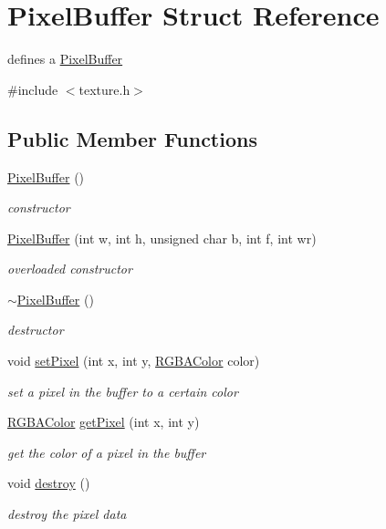 \hypertarget{struct_pixel_buffer}{}\section{Pixel\+Buffer Struct Reference}
\label{struct_pixel_buffer}


defines a \hyperlink{struct_pixel_buffer}{Pixel\+Buffer}  




{\ttfamily \#include $<$texture.\+h$>$}

\subsection*{Public Member Functions}
\begin{DoxyCompactItemize}
\item 
\hyperlink{struct_pixel_buffer_aa1d5199f80acc1c154a289b4519a7b97}{Pixel\+Buffer} ()
\begin{DoxyCompactList}\small\item\em constructor \end{DoxyCompactList}\item 
\hyperlink{struct_pixel_buffer_ada8b571a542bdd0be9cbe29116aac7c8}{Pixel\+Buffer} (int w, int h, unsigned char b, int f, int wr)
\begin{DoxyCompactList}\small\item\em overloaded constructor \end{DoxyCompactList}\item 
\mbox{\label{struct_pixel_buffer_ac2ac8a033a3c75cdb4f7e69b2724b3d7}} 
\hyperlink{struct_pixel_buffer_ac2ac8a033a3c75cdb4f7e69b2724b3d7}{$\sim$\+Pixel\+Buffer} ()
\begin{DoxyCompactList}\small\item\em destructor \end{DoxyCompactList}\item 
void \hyperlink{struct_pixel_buffer_a538a6b35401764c0eae72c3744b05cd5}{set\+Pixel} (int x, int y, \hyperlink{struct_r_g_b_a_color}{R\+G\+B\+A\+Color} color)
\begin{DoxyCompactList}\small\item\em set a pixel in the buffer to a certain color \end{DoxyCompactList}\item 
\hyperlink{struct_r_g_b_a_color}{R\+G\+B\+A\+Color} \hyperlink{struct_pixel_buffer_a426b4dd17e4f9d45e107f0390c0e87a9}{get\+Pixel} (int x, int y)
\begin{DoxyCompactList}\small\item\em get the color of a pixel in the buffer \end{DoxyCompactList}\item 
\mbox{\label{struct_pixel_buffer_aad1b15ec3e56a591e2ea09d2dd68aa62}} 
void \hyperlink{struct_pixel_buffer_aad1b15ec3e56a591e2ea09d2dd68aa62}{destroy} ()
\begin{DoxyCompactList}\small\item\em destroy the pixel data \end{DoxyCompactList}\end{DoxyCompactItemize}
